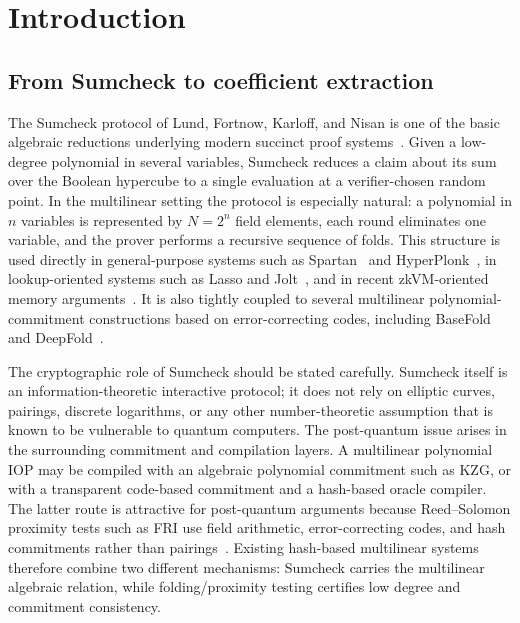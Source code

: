 \section{Introduction}
\label{sec:introduction}

\subsection{From Sumcheck to coefficient extraction}

The Sumcheck protocol of Lund, Fortnow, Karloff, and Nisan is one of the basic algebraic reductions underlying modern succinct proof systems~\cite{LFKN92}.  Given a low-degree polynomial in several variables, Sumcheck reduces a claim about its sum over the Boolean hypercube to a single evaluation at a verifier-chosen random point.  In the multilinear setting the protocol is especially natural: a polynomial in $n$ variables is represented by $N=2^n$ field elements, each round eliminates one variable, and the prover performs a recursive sequence of folds.  This structure is used directly in general-purpose systems such as Spartan~\cite{Setty20} and HyperPlonk~\cite{HyperPlonk23}, in lookup-oriented systems such as Lasso and Jolt~\cite{Lasso23,Jolt23}, and in recent zkVM-oriented memory arguments~\cite{TwistShout26}.  It is also tightly coupled to several multilinear polynomial-commitment constructions based on error-correcting codes, including BaseFold and DeepFold~\cite{BaseFold24,DeepFold25}.

The cryptographic role of Sumcheck should be stated carefully.  Sumcheck itself is an information-theoretic interactive protocol; it does not rely on elliptic curves, pairings, discrete logarithms, or any other number-theoretic assumption that is known to be vulnerable to quantum computers.  The post-quantum issue arises in the surrounding commitment and compilation layers.  A multilinear polynomial IOP may be compiled with an algebraic polynomial commitment such as KZG, or with a transparent code-based commitment and a hash-based oracle compiler.  The latter route is attractive for post-quantum arguments because Reed--Solomon proximity tests such as FRI use field arithmetic, error-correcting codes, and hash commitments rather than pairings~\cite{FRI18,WHIR24}.  Existing hash-based multilinear systems therefore combine two different mechanisms: Sumcheck carries the multilinear algebraic relation, while folding/proximity testing certifies low degree and commitment consistency.

